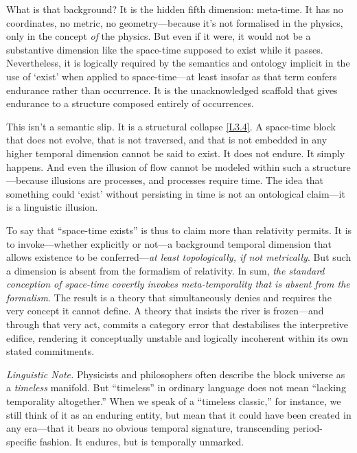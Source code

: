 \documentclass[12pt]{book}
\newcounter{logicanchor}
\newenvironment{logicanchorenv}[1]{\refstepcounter{logicanchor}\label{#1}}{}
\newcommand{\logiclink}[2]{\begin{logicanchorenv}{logic:#1}\end{logicanchorenv}\hyperref[appendix:#1]{[#1]}\xspace}
\begin{document}
What is that background? It is the hidden fifth dimension: meta-time. It has no coordinates, no metric, no geometry---because it's not formalised in the physics, only in the concept \textit{of} the physics. But even if it were, it would not be a substantive dimension like the space-time supposed to exist while it passes. Nevertheless, it is logically required by the semantics and ontology implicit in the use of `exist' when applied to space-time---at least insofar as that term confers endurance rather than occurrence. It is the unacknowledged scaffold that gives endurance to a structure composed entirely of occurrences.

This isn't a semantic slip. It is a structural collapse \logiclink{L3.4}{}. A space-time block that does not evolve, that is not traversed, and that is not embedded in any higher temporal dimension cannot be said to exist. It does not endure. It simply happens. And even the illusion of flow cannot be modeled within such a structure---because illusions are processes, and processes require time. The idea that something could `exist' without persisting in time is not an ontological claim---it is a linguistic illusion.

To say that ``space-time exists'' is thus to claim more than relativity permits. It is to invoke---whether explicitly or not---a background temporal dimension that allows existence to be conferred---\textit{at least topologically, if not metrically}. But such a dimension is absent from the formalism of relativity. In sum, \textit{the standard conception of space-time covertly invokes meta-temporality that is absent from the formalism}. The result is a theory that simultaneously denies and requires the very concept it cannot define. A theory that insists the river is frozen---and through that very act, commits a category error that destabilises the interpretive edifice, rendering it conceptually unstable and logically incoherent within its own stated commitments.

\vspace{6pt}
\noindent\textit{Linguistic Note.} Physicists and philosophers often describe the block universe as a \textit{timeless} manifold. But ``timeless'' in ordinary language does not mean ``lacking temporality altogether.'' When we speak of a ``timeless classic,'' for instance, we still think of it as an enduring entity, but mean that it could have been created in any era---that it bears no obvious temporal signature, transcending period-specific fashion. It endures, but is temporally unmarked.
\end{document}
